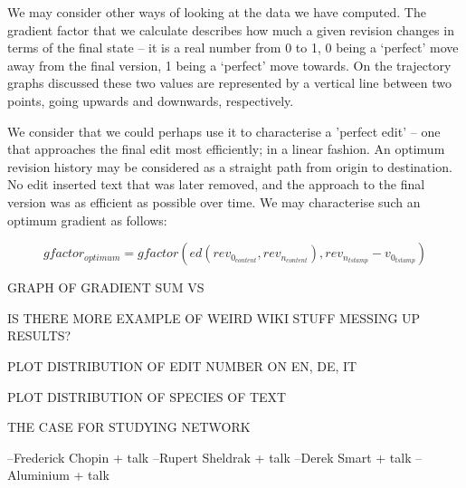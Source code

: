 We may consider other ways of looking at the data we have
computed. The gradient factor that we calculate describes how much a
given revision changes in terms of the final state -- it is a real
number from 0 to 1, 0 being a `perfect' move away from the final
version, 1 being a `perfect' move towards. On the trajectory graphs
discussed these two values are represented by a vertical line between
two points, going upwards and downwards, respectively. 

We consider that we could perhaps use it to characterise a 'perfect
edit' -- one that approaches the final edit most efficiently; in a
linear fashion. An optimum revision history may be considered as a
straight path from origin to destination. No edit inserted text that
was later removed, and the approach to the final version was as
efficient as possible over time. We may characterise such an optimum
gradient as follows:


\[
  gfactor_{optimum} = gfactor(ed(rev_{0_{content}},
  rev_{n_{content}}), rev_{n_{tstamp}} - v_{0_{tstamp}})
\]


GRAPH OF
GRADIENT SUM VS

IS THERE MORE EXAMPLE OF WEIRD WIKI STUFF MESSING UP RESULTS?

PLOT DISTRIBUTION OF EDIT NUMBER ON EN, DE, IT

PLOT DISTRIBUTION OF SPECIES OF TEXT 

THE CASE FOR STUDYING NETWORK 

--Frederick Chopin + talk
--Rupert Sheldrak + talk
--Derek Smart + talk
--Aluminium + talk
